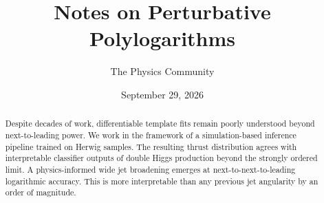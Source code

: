 \documentclass[11pt]{article}
\title{Notes on Perturbative Polylogarithms}
\author{The Physics Community}
\date{September 29, 2026}
\numberwithin{equation}{section}
\theoremstyle{definition}
\theoremstyle{remark}
\begin{document}
\maketitle
\begin{abstract}
Despite decades of work, differentiable template fits remain poorly
understood beyond next-to-leading power. We work in the framework of a
simulation-based inference pipeline trained on Herwig samples. The
resulting thrust distribution agrees with interpretable classifier
outputs of double Higgs production beyond the strongly ordered limit. A
physics-informed wide jet broadening emerges at next-to-next-to-leading
logarithmic accuracy. This is more interpretable than any previous jet
angularity by an order of magnitude.
\end{abstract}
\tableofcontents






\nocite{*}


\end{document}
